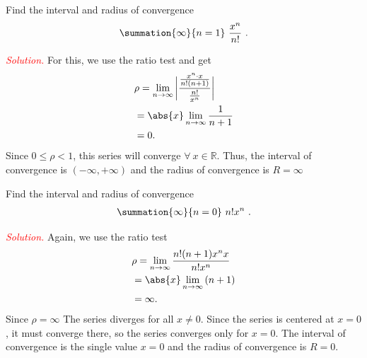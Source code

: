 \documentclass{report}
\begin{document}
    \pagebreak \bigbreak \noindent 
    \begin{exm}
        Find the interval and radius of convergence
        \begin{align*}
            \summation{\infty}{n=1}\ \frac{x^{n}}{n!}\ 
        .\end{align*}
    \end{exm}
    \bigbreak \noindent 
    \textcolor{red}{\textit{Solution.}} For this, we use the ratio test and get
    \begin{align*}
        &\rho = \lim\limits_{n \to \infty}{\bigg\lvert \frac{\frac{x^{n}\cdot x}{n!(n+1)}}{\frac{n!}{x^{n}}} \bigg\rvert} \\
        &=\abs{x}\lim\limits_{n \to \infty}{\frac{1}{n+1}} \\
        &=0
    .\end{align*}
    \bigbreak \noindent 
    Since $ 0 \leq \rho  < 1$, this series will converge $\forall\ x \in \mathbb{R} $. Thus, the interval of convergence is $(-\infty,+\infty) $ and the radius of convergence is $R = \infty $

    \bigbreak \noindent 
    \begin{exm}
         Find the interval and radius of convergence
         \begin{align*}
             \summation{\infty}{n=0}\ n!x^{n}\ 
         .\end{align*}
    \end{exm}
    \bigbreak \noindent 
    \textcolor{red}{\textit{Solution.}} Again, we use the ratio test
    \begin{align*}
        &\rho = \lim\limits_{n \to \infty}{\frac{n!(n+1)x^{n}x}{n!x^{n}}} \\
        &=\abs{x}\lim\limits_{n \to \infty}{(n+1)} \\
        &=\infty
    .\end{align*}
    \bigbreak \noindent 
    Since $\rho = \infty $ The series diverges for all \( x \neq 0 \). Since the series is centered at \( x = 0 \), it must converge there, so the series converges only for \( x = 0 \). The interval of convergence is the single value \( x = 0 \) and the radius of convergence is \( R = 0 \).
\end{document}
